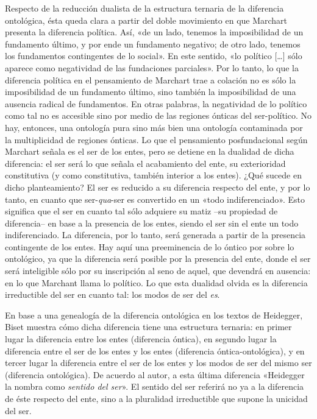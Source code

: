 Respecto de la reducción dualista de la estructura ternaria de la diferencia ontológica, ésta queda clara a partir del doble movimiento en que Marchart presenta la diferencia política. Así, «de un lado, tenemos la imposibilidad de un fundamento último, y por ende un fundamento negativo; de otro lado, tenemos los fundamentos contingentes de lo social». En este sentido, «lo político {[}\ldots{]} sólo aparece como negatividad de las fundaciones parciales». Por lo tanto, lo que la diferencia política en el pensamiento de Marchart trae a colación no es sólo la imposibilidad de un fundamento último, sino también la imposibilidad de una ausencia radical de fundamentos. En otras palabras, la negatividad de lo político como tal no es accesible sino por medio de las regiones ónticas del ser-político. No hay, entonces, una ontología pura sino más bien una ontología contaminada por la multiplicidad de regiones ónticas. Lo que el pensamiento posfundacional según Marchart señala es el ser de los entes, pero se detiene en la dualidad de dicha diferencia: el ser será lo que señala el acabamiento del ente, su exterioridad constitutiva (y como constitutiva, también interior a los entes). ¿Qué sucede en dicho planteamiento? El ser es reducido a su diferencia respecto del ente, y por lo tanto, en cuanto que ser-\emph{qua}-ser es convertido en un «todo indiferenciado». Esto significa que el ser en cuanto tal sólo adquiere su matiz --su propiedad de diferencia-- en base a la presencia de los entes, siendo el ser sin el ente un todo indiferenciado. La diferencia, por lo tanto, será generada a partir de la presencia contingente de los entes. Hay aquí una preeminencia de lo óntico por sobre lo ontológico, ya que la diferencia será posible por la presencia del ente, donde el ser será inteligible sólo por su inscripción al seno de aquel, que devendrá en ausencia: en lo que Marchant llama lo político. Lo que esta dualidad olvida es la diferencia irreductible del ser en cuanto tal: los modos de ser del \emph{es}.

En base a una genealogía de la diferencia ontológica en los textos de Heidegger, Biset muestra cómo dicha diferencia tiene una estructura ternaria: en primer lugar la diferencia entre los entes (diferencia óntica), en segundo lugar la diferencia entre el ser de los entes y los entes (diferencia óntica-ontológica), y en tercer lugar la diferencia entre el ser de los entes y los modos de ser del mismo ser (diferencia ontológica). De acuerdo al autor, a esta última diferencia «Heidegger la nombra como \emph{sentido del ser}». El sentido del ser referirá no ya a la diferencia de éste respecto del ente, sino a la pluralidad irreductible que supone la unicidad del ser.

